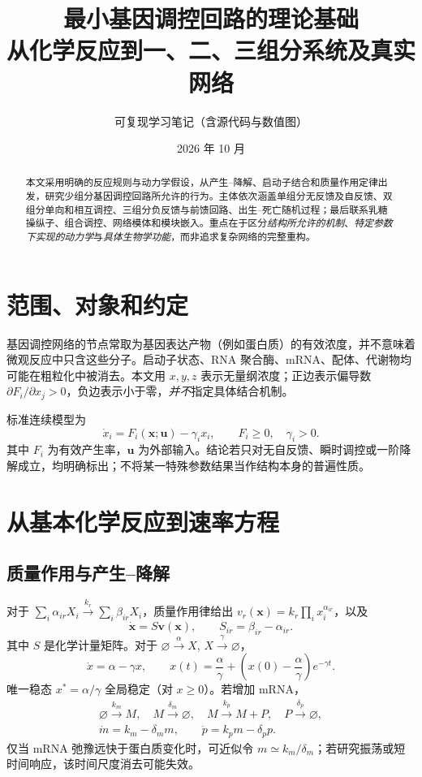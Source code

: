 \documentclass[11pt,a4paper,UTF8]{ctexart}
\title{\bfseries 最小基因调控回路的理论基础\\[4pt]\large 从化学反应到一、二、三组分系统及真实网络}
\author{可复现学习笔记（含源代码与数值图）}
\date{2026 年 10 月}
\begin{document}
\maketitle
\begin{abstract}
本文采用明确的反应规则与动力学假设，从产生--降解、启动子结合和质量作用定律出发，研究少组分基因调控回路所允许的行为。主体依次涵盖单组分无反馈及自反馈、双组分单向和相互调控、三组分负反馈与前馈回路、出生--死亡随机过程；最后联系乳糖操纵子、组合调控、网络模体和模块嵌入。重点在于区分\emph{结构所允许的机制}、\emph{特定参数下实现的动力学}与\emph{具体生物学功能}，而非追求复杂网络的完整重构。
\end{abstract}
\tableofcontents\newpage
\section{范围、对象和约定}
基因调控网络的节点常取为基因表达产物（例如蛋白质）的有效浓度，并不意味着微观反应中只含这些分子。启动子状态、RNA 聚合酶、mRNA、配体、代谢物均可能在粗粒化中被消去。本文用 $x,y,z$ 表示无量纲浓度；正边表示偏导数 $\partial F_i/\partial x_j>0$，负边表示小于零，\emph{并不}指定具体结合机制。

标准连续模型为
\begin{equation}\dot x_i=F_i(\bm{x};\bm{u})-\gamma_i x_i,\qquad F_i\geq0,\quad\gamma_i>0.\end{equation}
其中 $F_i$ 为有效产生率，$\bm u$ 为外部输入。结论若只对无自反馈、瞬时调控或一阶降解成立，均明确标出；不将某一特殊参数结果当作结构本身的普遍性质。

\section{从基本化学反应到速率方程}
\subsection{质量作用与产生--降解}
对于 $\sum_i\alpha_{ir}X_i\xrightarrow{k_r}\sum_i\beta_{ir}X_i$，质量作用律给出 $v_r(\bm x)=k_r\prod_i x_i^{\alpha_{ir}}$，以及
\begin{equation}\dot{\bm x}=S\bm v(\bm x),\qquad S_{ir}=\beta_{ir}-\alpha_{ir}.\end{equation}
其中 $S$ 是化学计量矩阵。对于 $\varnothing\xrightarrow{\alpha}X$, $X\xrightarrow{\gamma}\varnothing$，
\begin{equation}\dot x=\alpha-\gamma x,\qquad x(t)=\frac\alpha\gamma+\left(x(0)-\frac\alpha\gamma\right)e^{-\gamma t}.\end{equation}
唯一稳态 $x^*=\alpha/\gamma$ 全局稳定（对 $x\geq0$）。若增加 mRNA，
\begin{align}
\varnothing\xrightarrow{k_m}M,\quad M\xrightarrow{\delta_m}\varnothing,\quad M\xrightarrow{k_p}M+P,\quad P\xrightarrow{\delta_p}\varnothing,\\[-2pt]
\dot m=k_m-\delta_m m,\qquad\dot p=k_pm-\delta_p p.
\end{align}
仅当 mRNA 弛豫远快于蛋白质变化时，可近似令 $m\simeq k_m/\delta_m$；若研究振荡或短时间响应，该时间尺度消去可能失效。
\end{document}
